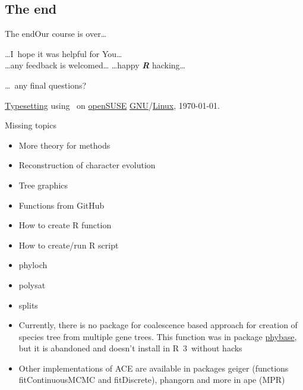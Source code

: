 \documentclass[compress, ucs, xelatex, 11pt, xcolor=svgnames,
  hyperref={
    bookmarks=true,
    unicode=true,
    colorlinks=true,
    pdftitle={Molecular data in R},
    plainpages=false,
    pdfauthor={Vojtech Zeisek},
    pdfsubject={Course about phylogeny and evolution in R},
    pdfcreator={XeLaTeX},
    pdfkeywords={R, evolution, phylogeny, molecular data},
    linkcolor=Tomato,
    anchorcolor=SaddleBrown,
    citecolor=Goldenrod,
    filecolor=DarkMagenta,
    menucolor=Sienna,
    urlcolor=DarkTurquoise,
    pdftex},
  url={hyphens, lowtilde} %
  ]{beamer}
\begin{document}
\subsection{The end}

\begin{frame}{The end}{Our course is over\ldots}
\begin{center}
  \ldots I~hope it was helpful for You\ldots\\
  \vfill
  \ldots any feedback is welcomed\ldots
  \vfill
  \ldots happy \textbf{\textit{R}} hacking\ldots
  \vfill
\end{center}
\begin{flushright}
  \ldots~any final questions?
  \vfill
  \begin{tiny}
   \href{https://en.wikipedia.org/wiki/XeTeX}{Typesetting} using \XeLaTeX~on \href{https://www.opensuse.org/}{openSUSE} \href{https://en.wikipedia.org/wiki/GNU}{GNU}/\href{https://en.wikipedia.org/wiki/Linux}{Linux}, \today.
  \end{tiny}
\end{flushright}
\end{frame}

\begin{frame}[allowframebreaks]{Missing topics}
  \begin{itemize}
    \item More theory for methods
    \item Reconstruction of character evolution
    \item Tree graphics
    \item Functions from GitHub
    \item How to create R function
    \item How to create/run R script
    \item phyloch
    \item polysat
    \item splits
    \item Currently, there is no package for coalescence based approach for creation of species tree from multiple gene trees. This function was in package \href{https://faculty.franklin.uga.edu/lliu/content/phybase}{phybase}, but it is abandoned and doesn't install in R~3~without hacks
    \item Other implementations of ACE are available in packages geiger (functions fitContinuousMCMC and fitDiscrete), phangorn and more in ape (MPR)
  \end{itemize}
\end{frame}
\end{document}
